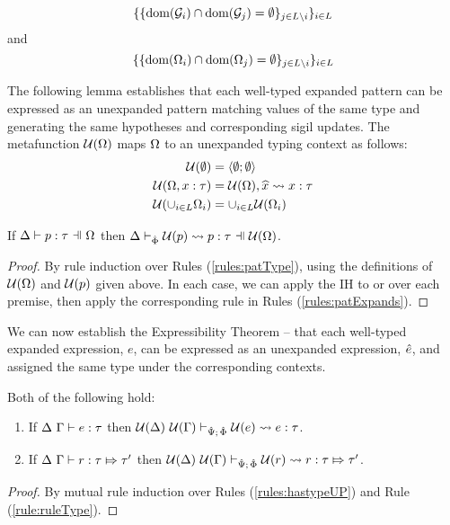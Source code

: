 {{{{\[\{\{\text{dom}(\mathcal{G}_i) \cap \text{dom}(\mathcal{G}_j) = \emptyset\}_{j \in L \setminus i}\}_{i \in L}\]
and
\[\{\{\text{dom}(\Omega_i) \cap \text{dom}(\Omega_j) = \emptyset\}_{j \in L \setminus i}\}_{i \in L}\]

The following lemma establishes that each well-typed expanded pattern can be expressed as an unexpanded pattern matching values of the same type and generating the same hypotheses and corresponding sigil updates. The metafunction $\mathcal{U}(\Omega)$ maps $\Omega$ to an unexpanded typing context as follows:
\begin{align*}
\mathcal{U}(\emptyset) & = \langle \emptyset; \emptyset \rangle\\
\mathcal{U}(\Omega, x : \tau) & = \mathcal{U}(\Omega), \widehat{x} \leadsto x : \tau\\
\mathcal{U}(\cup_{i \in L} \Omega_i) & = \cup_{i \in L} \mathcal{U}(\Omega_i)
\end{align*}
\begin{lemma}\label{lemma:pattern-expressibility} If $\patType{\pctx}{p}{\tau}$ then $\patExpands{\Uof{\pctx}}{\uPhi}{\Uof{p}}{p}{\tau}$.\end{lemma}
\begin{proof} By rule induction over Rules (\ref{rules:patType}), using the definitions of $\mathcal{U}(\Omega)$ and $\mathcal{U}(p)$ given above. In each case, we can apply the IH to or over each premise, then apply the corresponding rule in Rules (\ref{rules:patExpands}).\end{proof}

We can now establish the Expressibility Theorem -- that each well-typed expanded expression, $e$, can be expressed as an unexpanded expression, ${\hat e}$, and assigned the same type under the corresponding contexts.

\begin{theorem}[Expressibility] Both of the following hold:
\begin{enumerate}
\item If $\Delta~\Gamma \vdash e : \tau$ then $\mathcal{U}(\Delta)~\mathcal{U}(\Gamma) \vdash_{\hat{\Psi};\,\hat\Phi} \mathcal{U}(e) \leadsto e : \tau$.
\item If $\Delta~\Gamma \vdash r : \tau \Mapsto \tau'$ then $\mathcal{U}(\Delta)~\mathcal{U}(\Gamma) \vdash_{\hat{\Psi};\,\hat\Phi} \mathcal{U}(r) \leadsto r : \tau \Mapsto \tau'$.
\end{enumerate}
\end{theorem}
\begin{proof} By mutual rule induction over Rules (\ref{rules:hastypeUP}) and Rule (\ref{rule:ruleType}). 


\end{proof}}}}}
